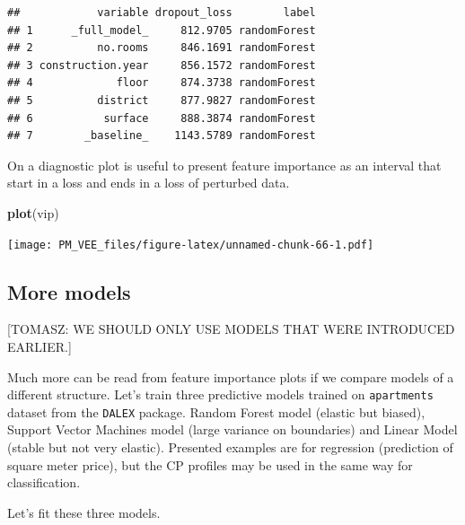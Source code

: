 \documentclass[12pt,]{krantz}
\newenvironment{Shaded}{\begin{snugshade}}{\end{snugshade}}
\newcommand{\KeywordTok}[1]{\textcolor[rgb]{0.13,0.29,0.53}{\textbf{#1}}}
\newcommand{\NormalTok}[1]{#1}
\begin{document}
\begin{verbatim}
##            variable dropout_loss        label
## 1      _full_model_     812.9705 randomForest
## 2          no.rooms     846.1691 randomForest
## 3 construction.year     856.1572 randomForest
## 4             floor     874.3738 randomForest
## 5          district     877.9827 randomForest
## 6           surface     888.3874 randomForest
## 7        _baseline_    1143.5789 randomForest
\end{verbatim}

On a diagnostic plot is useful to present feature importance as an interval that start in a loss and ends in a loss of perturbed data.

\begin{Shaded}
\begin{Highlighting}[]
\KeywordTok{plot}\NormalTok{(vip)}
\end{Highlighting}
\end{Shaded}

\texttt{[image: PM\_VEE\_files/figure-latex/unnamed-chunk-66-1.pdf]}

\hypertarget{more-models}{%
\subsection{More models}\label{more-models}}

{[}TOMASZ: WE SHOULD ONLY USE MODELS THAT WERE INTRODUCED EARLIER.{]}

Much more can be read from feature importance plots if we compare models of a different structure.
Let's train three predictive models trained on \texttt{apartments} dataset from the \texttt{DALEX} package. Random Forest model \citep{R-randomForest} (elastic but biased), Support Vector Machines model \citep{R-e1071} (large variance on boundaries) and Linear Model (stable but not very elastic).
Presented examples are for regression (prediction of square meter price), but the CP profiles may be used in the same way for classification.

Let's fit these three models.
\end{document}
